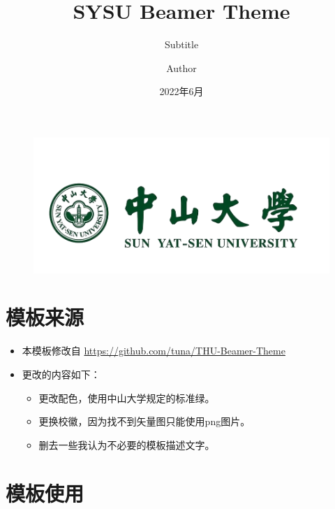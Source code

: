 \documentclass{beamer}
\author{Author}
\title{SYSU Beamer Theme}
\subtitle{Subtitle}
\institute{中山大学计算机学院（软件学院）}
\date{2022年6月}
\begin{document}
\kaishu
\begin{frame}
    \titlepage
    \begin{figure}[htpb]
        \begin{center}
            \includegraphics[width=0.32\linewidth]{pic/SYSUlogo.png}
        \end{center}
    \end{figure}
\end{frame}

\begin{frame}
    \tableofcontents[sectionstyle=show,subsectionstyle=show/shaded/hide,subsubsectionstyle=show/shaded/hide]
\end{frame}

\section{模板来源}

\begin{frame}
    \begin{itemize}
        \item 本模板修改自\cite{origin} \newline \url{https://github.com/tuna/THU-Beamer-Theme}
        \item 更改的内容如下：
            \begin{itemize}
                \item 更改配色，使用中山大学规定的标准绿。
                \item 更换校徽，因为找不到矢量图只能使用png图片。
                \item 删去一些我认为不必要的模板描述文字。
            \end{itemize}
    \end{itemize}
\end{frame}


\section{模板使用}
\end{document}

